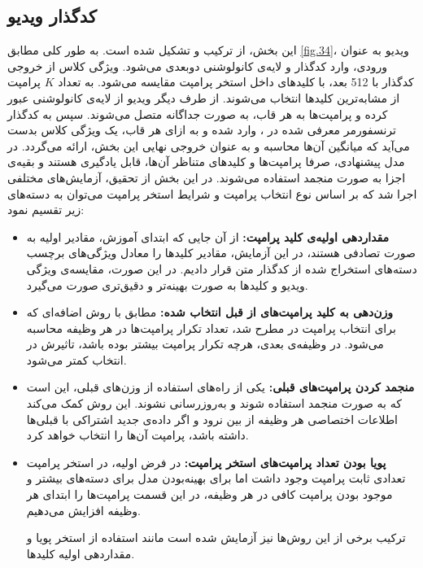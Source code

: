 \subsection{کدگذار ویدیو}
این بخش، از ترکیب  و  تشکیل شده است. به طور کلی مطابق \cref{fig.34}، ویدیو به عنوان ورودی، وارد کدگذار  و لایه‌ی کانولوشنی دو‌بعدی می‌شود. ویژگی کلاس  از خروجی کدگذار  با 512 بعد، با کلیدهای داخل استخر پرامپت مقایسه می‌شود. به تعداد $K$ پرامپت از مشابه‌ترین کلیدها انتخاب می‌شوند. از طرف دیگر ویدیو از لایه‌ی کانولوشنی عبور کرده و پرامپت‌ها به هر قاب، به صورت جداگانه متصل می‌شوند. سپس به کدگذار ترنسفورمر معرفی شده در ، وارد شده و به ازای هر قاب، یک ویژگی کلاس بدست می‌آید که میانگین آن‌ها محاسبه و به عنوان خروجی نهایی این بخش، ارائه می‌گردد. در مدل پیشنهادی، صرفا پرامپت‌ها و کلیدهای متناظر آن‌ها، قابل یادگیری هستند و بقیه‌ی اجزا به صورت منجمد استفاده می‌شوند. در این بخش از تحقیق، آزمایش‌های مختلفی اجرا شد که بر اساس نوع انتخاب پرامپت و شرایط استخر پرامپت می‌توان به دسته‌‌های زیر تقسیم نمود:
\begin{itemize}
\item \textbf{مقداردهی اولیه‌ی کلید پرامپت:}
از آن جایی که ابتدای آموزش، مقادیر اولیه به صورت تصادفی هستند، در این آزمایش، مقادیر کلیدها را معادل ویژگی‌های برچسب دسته‌های استخراج شده از کدگذار متن قرار دادیم. در این صورت، مقایسه‌ی ویژگی ویدیو و کلیدها به صورت بهینه‌تر و دقیق‌تری صورت می‌گیرد. 
\item \textbf{وزن‌دهی به کلید پرامپت‌های از قبل انتخاب شده:}
مطابق با روش اضافه‌ای که برای انتخاب پرامپت در  مطرح شد، تعداد تکرار پرامپت‌ها در هر وظیفه محاسبه می‌شود. در وظیفه‌ی بعدی، هرچه تکرار پرامپت بیشتر بوده باشد، تاثیرش در انتخاب کمتر می‌شود. 
\item \textbf{منجمد کردن پرامپت‌های قبلی:}
یکی از راه‌های استفاده از وزن‌های قبلی، این است که به صورت منجمد استفاده شوند و به‌روزرسانی نشوند. این روش کمک می‌کند اطلاعات اختصاصی هر وظیفه از بین نرود و اگر داده‌ی جدید اشتراکی با قبلی‌ها داشته باشد، پرامپت آن‌ها را انتخاب خواهد کرد.
\item \textbf{پویا بودن تعداد پرامپت‌های استخر پرامپت:}
در فرض اولیه، در استخر پرامپت تعدادی ثابت پرامپت وجود داشت اما برای بهینه‌بودن مدل برای دسته‌های بیشتر و موجود بودن پرامپت کافی در هر وظیفه، در این قسمت پرامپت‌ها را ابتدای هر وظیفه افزایش می‌دهیم. 

ترکیب برخی از این روش‌ها نیز آزمایش شده است مانند استفاده از استخر پویا و مقداردهی اولیه کلیدها.  
\end{itemize}
